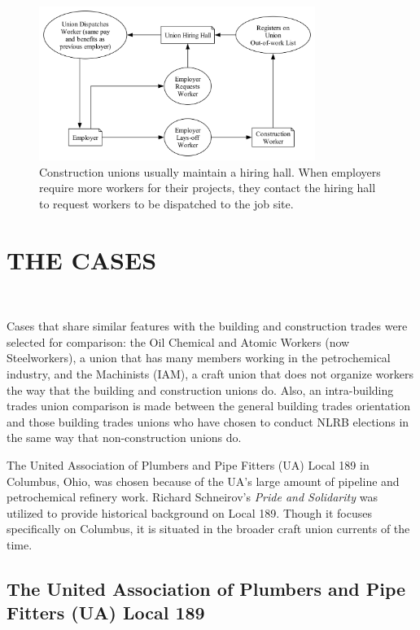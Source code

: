 \documentclass[12pt]{article}
\newcommand{\imageWidth}{0.8\textwidth}
\begin{document}
\begin{figure}[ht]
  \centering
  \includegraphics[width=\imageWidth]{images/hiring_hall}
  \captionsetup{justification=centering, singlelinecheck=false, margin=2cm} 
  \caption[Union Hiring Hall]{Construction unions usually maintain a hiring hall. When employers require more workers for their projects, they contact the hiring hall to request workers to be dispatched to the job site.}
  \label{fig:hiring_hall}
\end{figure}

\section{THE CASES} \

Cases that share similar features with the building and construction trades were selected for comparison: the Oil Chemical and Atomic Workers (now Steelworkers), a union that has many members working in the petrochemical industry, and the Machinists (IAM), a craft union that does not organize workers the way that the building and construction unions do. Also, an intra-building trades union comparison is made between the general building trades orientation and those building trades unions who have chosen to conduct NLRB elections in the same way that non-construction unions do.

The United Association of Plumbers and Pipe Fitters (UA) Local 189 in Columbus, Ohio, was chosen because of the UA's large amount of pipeline and petrochemical refinery work. Richard Schneirov's \textit{Pride and Solidarity} was utilized to provide historical background on Local 189. Though it focuses specifically on Columbus, it is situated in the broader craft union currents of the time.

\subsection{The United Association of Plumbers and Pipe Fitters (UA) Local 189} \
\end{document}
